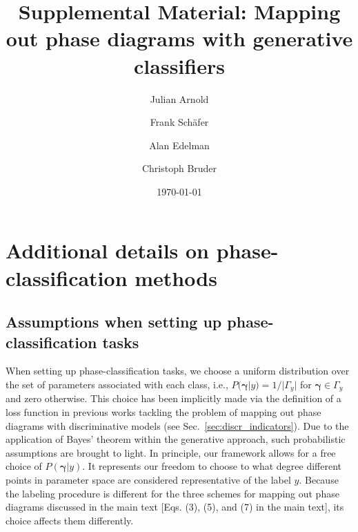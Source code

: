 \documentclass[twocolumn,aps,pra,superscriptaddress,tightlines,nofootinbib]{revtex4-2}
\begin{document}
	
	\setcounter{equation}{0}
	\setcounter{figure}{0}
	\setcounter{table}{0}
	\setcounter{page}{1}
	\makeatletter
	\renewcommand{\thesection}{S\arabic{section}}
	\renewcommand{\theequation}{S\arabic{equation}}
	\renewcommand{\thefigure}{S\arabic{figure}}
	
	\title{Supplemental Material: Mapping out phase diagrams with generative classifiers}
	\author{Julian Arnold}
	\author{Frank Sch\"afer}
	\author{Alan Edelman}
	\author{Christoph Bruder}
	\date{\today}
	
	\maketitle
	
	\section{Additional details on phase-classification methods}
	\subsection{Assumptions when setting up phase-classification tasks}
	When setting up phase-classification tasks, we choose a uniform distribution over the set of parameters associated with each class, i.e., $P(\bm{\gamma}|y) = 1 / |\Gamma_{y}|$ for $\bm{\gamma}\in \Gamma_{y}$ and zero otherwise. This choice has been implicitly made via the definition of a loss function in previous works tackling the problem of mapping out phase diagrams with discriminative models (see Sec.~\ref{sec:discr_indicators}). Due to the application of Bayes' theorem within the generative approach, such probabilistic assumptions are brought to light. In principle, our framework allows for a free choice of $P(\bm{\gamma}|y)$. It represents our freedom to choose to what degree different points in parameter space are considered representative of the label $y$. Because the labeling procedure is different for the three schemes for mapping out phase diagrams discussed in the main text [Eqs. (3), (5), and (7) in the main text], its choice affects them differently. 
	
\end{document}
